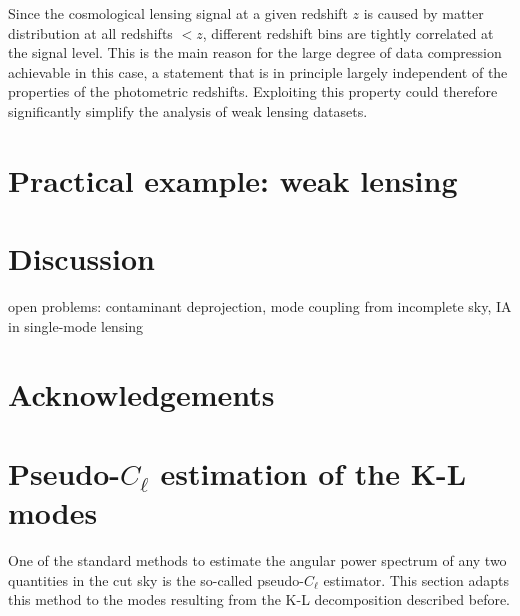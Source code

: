 \documentclass[twocolumn,amsfont,amssymb,amsmath, showpacs,balancelastpage, nofootinbib]{revtex4-1}
\begin{document}
    Since the cosmological lensing signal at a given redshift $z$ is caused by matter distribution at all redshifts $<z$, different redshift bins are tightly correlated at the signal level. This is the main reason for the large degree of data compression achievable in this case, a  statement that is in principle largely independent of the properties of the photometric redshifts. Exploiting this property could therefore significantly simplify the analysis of weak lensing datasets.
    
\section{Practical example: weak lensing}
  \lipsum[2]

\section{Discussion}\label{sec:discussion}
  \lipsum[3]
  
  open problems: contaminant deprojection, mode coupling from incomplete sky, IA in single-mode lensing
  
  
\section*{Acknowledgements}
  \lipsum[4]
  


\appendix
\onecolumngrid
\section{Pseudo-$C_\ell$ estimation of the K-L modes}\label{app:pcl}
  One of the standard methods to estimate the angular power spectrum of any two quantities in the cut sky is the so-called pseudo-$C_\ell$ estimator. This section adapts this method to the modes resulting from the K-L decomposition described before.
  
\end{document}
